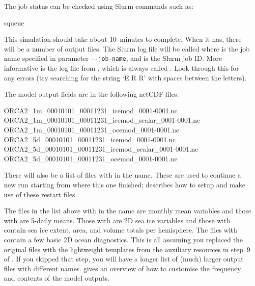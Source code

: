 The job status can be checked using Slurm commands such as:

\begin{VerbatimCMD}
squeue  
\end{VerbatimCMD}

This simulation should take about 10~minutes to complete.
When it has, there will be a number of output files.
The Slurm log file will be called  where  is the job name specified in  parameter \texttt{-{}-job-name}, and  is the Slurm job ID.
More informative is the log file from \NEMOSIcu{}, which is always called .
Look through this for any errors (try searching for the string `E R R' with spaces between the letters).

The model output fields are in the following netCDF files:

\begin{VerbatimFile}[samepage=true]
ORCA2_1m_00010101_00011231_icemod_0001-0001.nc
ORCA2_1m_00010101_00011231_icemod_scalar_0001-0001.nc
ORCA2_1m_00010101_00011231_ocemod_0001-0001.nc
ORCA2_5d_00010101_00011231_icemod_0001-0001.nc
ORCA2_5d_00010101_00011231_icemod_scalar_0001-0001.nc
ORCA2_5d_00010101_00011231_ocemod_0001-0001.nc
\end{VerbatimFile}

There will also be a list of files with  in the name.
These are used to continue a new run starting from where this one finished;  describes how to setup and make use of these restart files.

The files in the list above with  in the name are monthly mean variables and those with  are 5-daily means.
Those with  are 2D sea ice variables and those with  contain sea ice extent, area, and volume totals per hemisphere.
The files with  contain a few basic 2D ocean diagnostics.
This is all assuming you replaced the original  files with the lightweight templates from the auxiliary resources in step~9 of .
If you skipped that step, you will have a longer list of (much) larger output files with different names.
 gives an overview of how to customise the frequency and contents of the model outputs.
